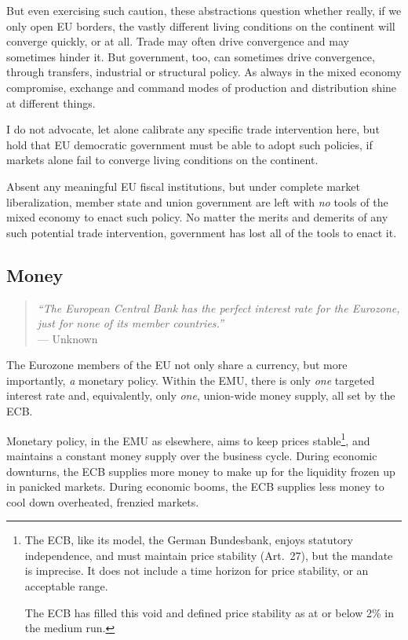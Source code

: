 But even exercising such caution, these abstractions question whether really, if we only open \gls{EU} borders, the vastly different living conditions on the continent will converge quickly, or at all.
Trade may often drive convergence and may sometimes hinder it.
But government, too, can sometimes drive convergence, through transfers, industrial or structural policy.
As always in the mixed economy compromise, exchange and command modes of production and distribution shine at different things.

I do not advocate, let alone calibrate any specific trade intervention here, but hold that \gls{EU} democratic government must be able to adopt such policies, if markets alone fail to converge living conditions on the continent.

Absent any meaningful \gls{EU} fiscal institutions, but under complete market liberalization, member state and union government are left with \emph{no} tools of the mixed economy to enact such policy.
No matter the merits and demerits of any such potential trade intervention, government has lost all of the tools to enact it.

\subsection{Money}

\begin{quote}
	\emph{``The European Central Bank has the perfect interest rate for the Eurozone, just for none of its member countries.''}\\
	--- Unknown
\end{quote}

The Eurozone members of the \gls{EU} not only share a currency, but more importantly, \emph{a} monetary policy.
Within the \gls{EMU}, there is only \emph{one} targeted interest rate and, equivalently, only \emph{one}, union-wide money supply, all set by the \gls{ECB}.

Monetary policy, in the \gls{EMU} as elsewhere, aims to keep prices stable\footnote{
	The \gls{ECB}, like its model, the German Bundesbank, enjoys statutory independence, and must maintain price stability (Art.~27), but the mandate is imprecise.
It does not include a time horizon for price stability, or an acceptable range.

	The \gls{ECB} has filled this void and defined price stability as at or below 2\% in the medium run.},
and maintains a constant money supply over the business cycle.
During economic downturns, the \gls{ECB} supplies more money to make up for the liquidity frozen up in panicked markets.
During economic booms, the \gls{ECB} supplies less money to cool down overheated, frenzied markets.

